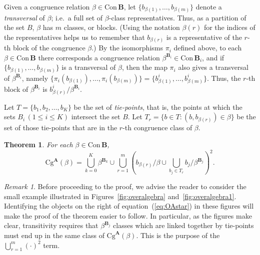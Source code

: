 \documentclass[cm,dissertation,actual,final]{uhthesis}
\theoremstyle{plain}
\newtheorem{theorem}{Theorem}[section]
\theoremstyle{definition}
\theoremstyle{remark}
\newtheorem*{remark}{Remark}
\numberwithin{theorem}{section}
\numberwithin{claim}{chapter}
\numberwithin{equation}{section}
\numberwithin{conjecture}{chapter}
\newcommand{\<}{\ensuremath{\langle}}
\renewcommand{\>}{\ensuremath{\rangle}}
\renewcommand{\leq}{\ensuremath{\leqslant}}
\newcommand{\Cg}{\ensuremath{\mathrm{Cg}}}
\newcommand{\Con}{\ensuremath{\mathrm{Con\,}}}
\newcommand{\0}{\ensuremath{\mathbf{0}}}
\newcommand{\1}{\ensuremath{\mathbf{1}}}
\newcommand{\2}{\ensuremath{\mathbf{2}}}
\newcommand{\3}{\ensuremath{\mathbf{3}}}
\newcommand{\4}{\ensuremath{\mathbf{4}}}
\newcommand{\5}{\ensuremath{\mathbf{5}}}
\newcommand{\bA}{\ensuremath{\mathbf{A}}}
\newcommand{\bB}{\ensuremath{\mathbf{B}}}
\newcommand{\bBi}{\ensuremath{\mathbf{B}_i}}
\begin{document}
Given a congruence relation $\beta \in \Con \bB$, let 
$\{b_{\beta(1)}, \dots, b_{\beta(m)}\}$ denote a \emph{transversal} of $\beta$;
i.e.~a full set of $\beta$-class representatives.  
Thus, as a partition of the set $B$, $\beta$ has $m$
classes, or blocks.  (Using the notation $\beta(r)$ for the indices of the
representatives helps us to remember that $b_{\beta(r)}$ is a representative of the
$r$-th block of the congruence $\beta$.)
By the isomorphisms $\pi_i$ defined above, to each
$\beta \in \Con \bB$  there corresponds a congruence relation 
$\beta^{\bBi} \in \Con \bB_i$, and if
$\{b_{\beta(1)}, \dots, b_{\beta(m)}\}$ is a transversal of $\beta$, then 
the map $\pi_i$ also gives a transversal of $\beta^{\bBi}$, namely
$\{\pi_i(b_{\beta(1)}), \dots, \pi_i(b_{\beta(m)})\}
=\{b^i_{\beta(1)}, \dots, b^i_{\beta(m)}\}$.  
Thus, the $r$-th block of $\beta^{\bBi}$ is $b^i_{\beta(r)}/\beta^{\bBi}$.

Let $T = \{b_1, b_2, \dots, b_K\}$ be the set of \emph{tie-points}, that is, the
points at which the sets $B_i\, (1\leq i\leq K)$ intersect the set $B$.
Let $T_r = \{b\in T : (b, b_{\beta(r)}) \in \beta\}$ be the set of those
tie-points that are in the $r$-th congruence class of $\beta$.
\begin{theorem}
  \label{OAthm1}
  For each $\beta \in \Con \bB$, 
  \begin{equation}
    \label{eq:OAstar}
    \Cg^\bA(\beta) = \bigcup_{k=0}^K \beta^{\bB_k} \cup \bigcup_{r=1}^m 
    \left(b_{\beta(r)}/\beta \cup \bigcup_{b_j\in T_r} b_j/\beta^{\bB_j}\right)^2.
  \end{equation}
\end{theorem}

\begin{remark}
  Before proceeding to the proof, we advise the reader to consider the small
  example illustrated in Figures~\ref{fig:overalgebra}
  and~\ref{fig:overalgebra1}.  Identifying the objects on the right of
  equation~(\ref{eq:OAstar}) in these figures will make the proof of the theorem
  easier to follow.
  In particular, as the figures make clear, transitivity requires that
  $\beta^{\bB_j}$ classes which are linked together by tie-points must end up in
  the same class of $\Cg^\bA(\beta)$.  This is the purpose of the
  $\bigcup\limits_{r=1}^m (\cdot)^2$ term. 
\end{remark}
\end{document}
